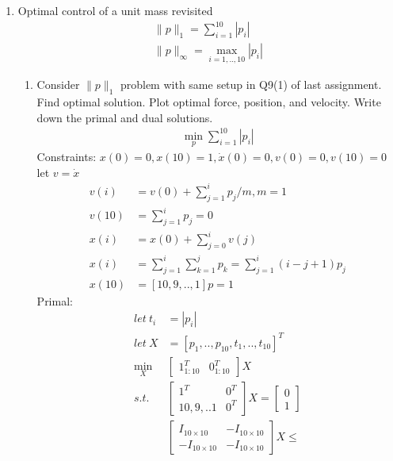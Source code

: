 \documentclass[12pt,letter]{article}
\newcommand{\norm}[1]{\|#1\|}
\begin{document}
\begin{enumerate}
\item Optimal control of a unit mass revisited\\
  \begin{align*}
    \norm{p}_1 = \sum_{i=1}^{10} |p_i|\\
    \norm{p}_{\infty} = \max_{i=1,..,10} |p_i|
  \end{align*}
  \begin{enumerate}
  \item Consider $\norm{p}_1$ problem with same setup in Q9(1) of last assignment. Find optimal solution. Plot optimal force, position, and velocity. Write down the primal and dual solutions.
    \begin{align*}
      \min_p \sum_{i=1}^{10} |p_i|
    \end{align*}
    Constraints: $x(0)=0,x(10)=1,\dot{x}(0)=0,v(0)=0,v(10)=0$\\
    let $v=\dot{x}$
    \begin{align*}
      v(i) &= v(0) + \sum_{j=1}^i p_j/m,m=1\\
      v(10) &= \sum_{j=1}^i p_j = 0\\
      x(i) &= x(0) + \sum_{j=0}^i v(j)\\
      x(i) &= \sum_{j=1}^i \sum_{k=1}^j p_k = \sum_{j=1}^i (i-j+1)p_j\\
      x(10) &= [10,9,..,1]p=1
    \end{align*}
    Primal:
    \begin{align*}
      let\ t_i &= |p_i|\\
      let\ X &= [p_1,..,p_{10}, t_1,..,t_{10}]^T\\
      \min_X &
      \begin{bmatrix}
        1_{1:10}^T & 0_{1:10}^T
      \end{bmatrix} X\\
      s.t.\ 
        &\begin{bmatrix}
          1^T & 0^T\\
          10,9,..1 & 0^T
        \end{bmatrix} X
                     =
                     \begin{bmatrix}
                       0 \\ 1
                     \end{bmatrix}\\
      &\begin{bmatrix}
        I_{10\times 10} & -I_{10\times 10}\\
        -I_{10\times 10} & -I_{10\times 10}
      \end{bmatrix}X \leq

\end{align*}
\end{enumerate}
\end{enumerate}
\end{document}
